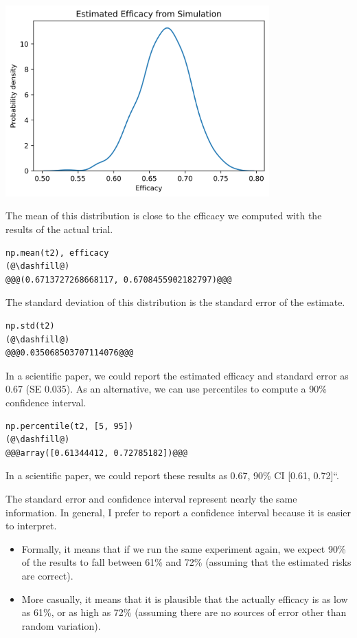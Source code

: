 \begin{center}
\includegraphics[width=4in]{chapters/11_resampling_files/11_resampling_44_0.png}
\end{center}

The mean of this distribution is close to the efficacy we computed with
the results of the actual trial.

\begin{lstlisting}[]
np.mean(t2), efficacy
(@\dashfill@)
@@@(0.6713727268668117, 0.6708455902182797)@@@
\end{lstlisting}

The standard deviation of this distribution is the standard error of the
estimate.

\begin{lstlisting}[]
np.std(t2)
(@\dashfill@)
@@@0.035068503707114076@@@
\end{lstlisting}

In a scientific paper, we could report the estimated efficacy and
standard error as 0.67 (SE 0.035). As an alternative, we can use
percentiles to compute a 90\% confidence interval.

\begin{lstlisting}[]
np.percentile(t2, [5, 95])
(@\dashfill@)
@@@array([0.61344412, 0.72785182])@@@
\end{lstlisting}

In a scientific paper, we could report these results as 0.67, 90\% CI
{[}0.61, 0.72{]}``.

The standard error and confidence interval represent nearly the same
information. In general, I prefer to report a confidence interval
because it is easier to interpret.

\begin{itemize}
\item
  Formally, it means that if we run the same experiment again, we expect
  90\% of the results to fall between 61\% and 72\% (assuming that the
  estimated risks are correct).
\item
  More casually, it means that it is plausible that the actually
  efficacy is as low as 61\%, or as high as 72\% (assuming there are no
  sources of error other than random variation).
\end{itemize}

